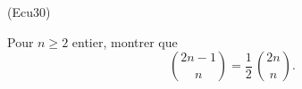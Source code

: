 \begin{tiny}(Ecu30)\end{tiny} Pour $n\geq 2$ entier, montrer que
\begin{displaymath}
 \binom{2n-1}{n} = \frac{1}{2}\,\binom{2n}{n}.
\end{displaymath}
